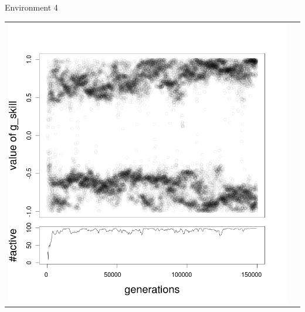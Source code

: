 \documentclass[8pt, handout=show,notes=show]{beamer}
\begin{document}
\begin{frame}{Environment 4}
\begin{table}[H]
\begin{tabular}{cc}
 \newline
 \includegraphics[width=\imgSize]{../images/5StaticEnv/Gplot58_staticEnv4}&
\end{tabular}

\end{table}
\end{frame}
\end{document}
